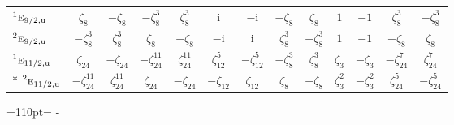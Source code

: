 \documentclass[10pt,a4paper]{article}
\newcommand{\needspace}[1]{\par\penalty-100\begingroup\dimen0=#1\relax\dimen2=\pagegoal
  \advance\dimen2-\pagetotal\ifdim\dimen0>\dimen2\relax\ifdim\dimen2>0pt\vfil\break\fi\fi
  \endgroup}
\numberwithin{equation}{section}
\newcommand{\irr}[1]{\text{\normalfont\scshape #1}}
\newcommand{\conjpair}[1]{{}^{#1}}
\newcommand{\ptag}[1]{\mathrm{#1}}
\newcommand{\iunit}{\mathrm{i}}
\newcommand{\rootunity}[1]{\zeta_{#1}}
\begin{document}
{\begin{longtable}{@{}lcccccccccccc@{}}
$\conjpair{1}\irr{e}_{9/2,\ptag{u}}$ & $\rootunity{8}$ & $-\rootunity{8}$ & $-\rootunity{8}^{3}$ & $\rootunity{8}^{3}$ & $\iunit{}$ & $-\iunit{}$ & $-\rootunity{8}$ & $\rootunity{8}$ & $1$ & $-1$ & $\rootunity{8}^{3}$ & $-\rootunity{8}^{3}$\\
$\conjpair{2}\irr{e}_{9/2,\ptag{u}}$ & $-\rootunity{8}^{3}$ & $\rootunity{8}^{3}$ & $\rootunity{8}$ & $-\rootunity{8}$ & $-\iunit{}$ & $\iunit{}$ & $\rootunity{8}^{3}$ & $-\rootunity{8}^{3}$ & $1$ & $-1$ & $-\rootunity{8}$ & $\rootunity{8}$\\
$\conjpair{1}\irr{e}_{11/2,\ptag{u}}$ & $\rootunity{24}$ & $-\rootunity{24}$ & $-\rootunity{24}^{11}$ & $\rootunity{24}^{11}$ & $\rootunity{12}^{5}$ & $-\rootunity{12}^{5}$ & $-\rootunity{8}^{3}$ & $\rootunity{8}^{3}$ & $\rootunity{3}$ & $-\rootunity{3}$ & $-\rootunity{24}^{7}$ & $\rootunity{24}^{7}$\\*
$\conjpair{2}\irr{e}_{11/2,\ptag{u}}$ & $-\rootunity{24}^{11}$ & $\rootunity{24}^{11}$ & $\rootunity{24}$ & $-\rootunity{24}$ & $-\rootunity{12}$ & $\rootunity{12}$ & $\rootunity{8}$ & $-\rootunity{8}$ & $\rootunity{3}^{2}$ & $-\rootunity{3}^{2}$ & $\rootunity{24}^{5}$ & $-\rootunity{24}^{5}$\\
\bottomrule\end{longtable}}
\needspace{110pt}
\end{document}
